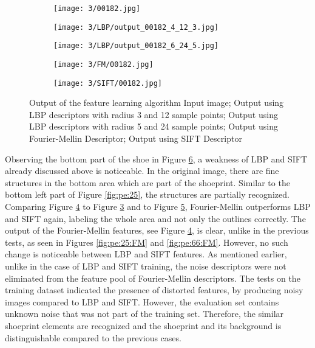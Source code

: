 \documentclass[draft,final]{vutinfth} %
\begin{document}
\begin{figure}[h]
  \centering
  \begin{subfigure}[t]{0.19\columnwidth}
    \centering
    \texttt{[image: 3/00182.jpg]}
    \subcaption{}
    \label{fig:pe:182:orig}
  \end{subfigure}
  \begin{subfigure}[t]{0.19\columnwidth}
    \centering
    \texttt{[image: 3/LBP/output\_00182\_4\_12\_3.jpg]}
    \subcaption{}
    \label{fig:pe:182:LBPs}
  \end{subfigure}
  \begin{subfigure}[t]{0.19\columnwidth}
    \centering
    \texttt{[image: 3/LBP/output\_00182\_6\_24\_5.jpg]}
    \subcaption{}
    \label{fig:pe:182:LBPb}
  \end{subfigure}
  \begin{subfigure}[t]{0.19\columnwidth}
    \centering
    \texttt{[image: 3/FM/00182.jpg]}
    \subcaption{}
    \label{fig:pe:182:FM}
  \end{subfigure}
  \begin{subfigure}[t]{0.19\columnwidth}
    \centering
    \texttt{[image: 3/SIFT/00182.jpg]}
    \subcaption{}
    \label{fig:pe:182:SIFT}
  \end{subfigure}
  \caption{Output of the feature learning algorithm  Input image;  Output using LBP descriptors with radius 3 and 12 sample points;  Output using LBP descriptors with radius 5 and 24 sample points;  Output using Fourier-Mellin Descriptor;  Output using SIFT Descriptor}
  \label{fig:pe:182}
\end{figure}

\par
Observing the bottom part of the shoe in Figure \ref{fig:pe:182}, a weakness of LBP and SIFT already discussed above is noticeable.
In the original image, there are fine structures in the bottom area which are part of the shoeprint.
Similar to the bottom left part of Figure \ref{fig:pe:25}, the structures are partially recognized.
Comparing Figure \ref{fig:pe:182:FM} to Figure \ref{fig:pe:182:LBPb} and to Figure \ref{fig:pe:182:SIFT}, Fourier-Mellin outperforms LBP and SIFT again, labeling the whole area and not only the outlines correctly.
The output of the Fourier-Mellin features, see Figure \ref{fig:pe:182:FM}, is clear, unlike in the previous tests, as seen in Figures \ref{fig:pe:25:FM} and \ref{fig:pe:66:FM}.
However, no such change is noticeable between LBP and SIFT features.
As mentioned earlier, unlike in the case of LBP and SIFT training, the noise descriptors were not eliminated from the feature pool of Fourier-Mellin descriptors.
The tests on the training dataset indicated the presence of distorted features, by producing noisy images compared to LBP and SIFT.
However, the evaluation set contains unknown noise that was not part of the training set.
Therefore, the similar shoeprint elements are recognized and the shoeprint and its background is distinguishable compared to the previous cases.
\end{document}

